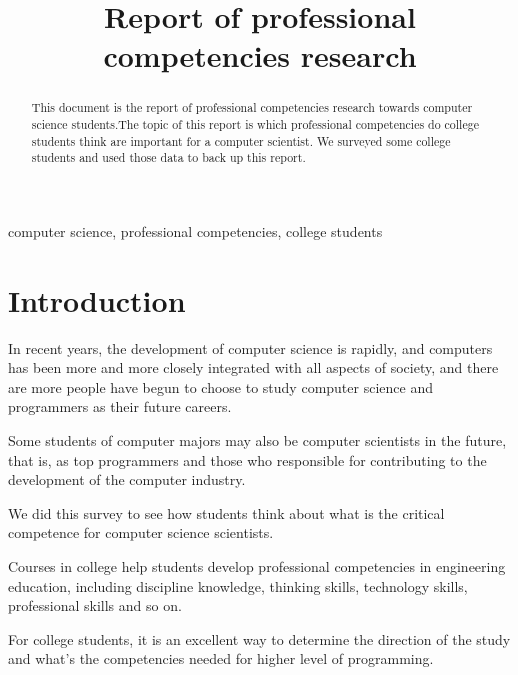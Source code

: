 \documentclass[conference]{IEEEtran}
\begin{document}
\title{Report of professional competencies research\\
}

\author{
\and
{}
\and
{}
\and
{}
}

\maketitle

\begin{abstract}
This document is the report of professional competencies research towards computer science students.The topic of this report is which professional competencies do college students think are important for a computer scientist. We surveyed some college students and used those data to back up this report. 
\end{abstract}

\begin{IEEEkeywords}
computer science, professional competencies, college students
\end{IEEEkeywords}

\section{Introduction}
\par In recent years, the development of computer science is rapidly, and computers has been more and more closely integrated with all aspects of society, and there are more people have begun to choose to study computer science and programmers as their future careers.
\par Some students of computer majors may also be computer scientists in the future, that is, as top programmers and those who responsible for contributing to the development of the computer industry. 
\par We did this survey to see how students think about what is the critical competence for computer science scientists.
\par Courses in college help students develop professional competencies in engineering education, including discipline knowledge, thinking skills, technology skills, professional skills and so on.
\par For college students, it is an excellent way to determine the direction of the study and what's the competencies needed for higher level of programming.
\end{document}
